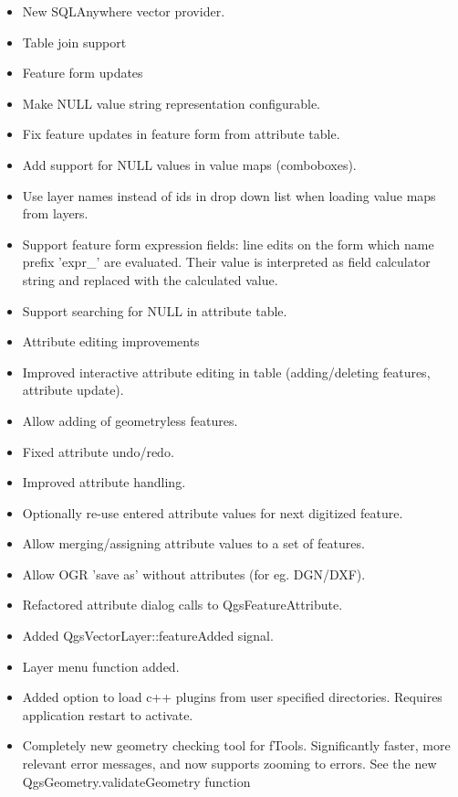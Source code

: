 \begin{itemize}[label=--]
\item New SQLAnywhere vector provider.
\item Table join support
\item Feature form updates
\item Make NULL value string representation configurable.
\item Fix feature updates in feature form from attribute table.
\item Add support for NULL values in value maps (comboboxes).
\item Use layer names instead of ids in drop down list when loading value maps from layers.
\item Support feature form expression fields: line edits on the form which name prefix 'expr\_' are evaluated. Their value is interpreted as field calculator string and replaced with the calculated value.
\item Support searching for NULL in attribute table.
\item Attribute editing improvements
\item Improved interactive attribute editing in table (adding/deleting features, attribute update).
\item Allow adding of geometryless features.
\item Fixed attribute undo/redo.
\item Improved attribute handling.
\item Optionally re-use entered attribute values for next digitized feature.
\item Allow merging/assigning attribute values to a set of features.
\item Allow OGR 'save as' without attributes (for eg. DGN/DXF).
\end{itemize}


\begin{itemize}[label=--]
\item Refactored attribute dialog calls to QgsFeatureAttribute.
\item Added QgsVectorLayer::featureAdded signal.
\item Layer menu function added.
\item Added option to load c++ plugins from user specified directories. Requires application restart to activate.
\item Completely new geometry checking tool for fTools. Significantly faster, more relevant error messages, and now supports zooming to errors. See the new QgsGeometry.validateGeometry function
\end{itemize}

